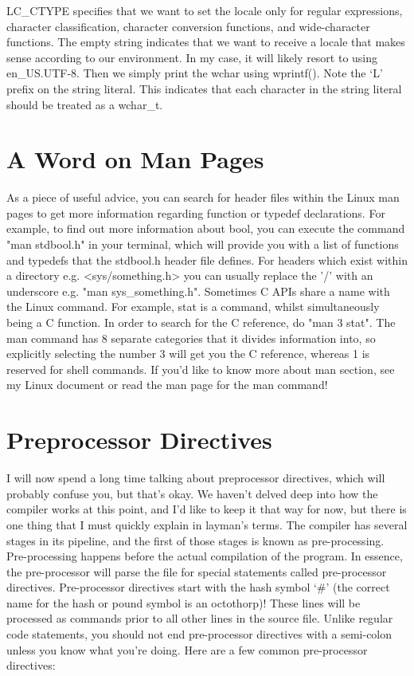 \documentclass{article}
\begin{document}
LC\_CTYPE specifies that we want to set the locale only for regular expressions, character classification,
character conversion functions, and wide-character functions. The empty string indicates that we want to
receive a locale that makes sense according to our environment. In my case, it will likely resort to using
en\_US.UTF-8. Then we simply print the wchar using wprintf(). Note the ‘L’ prefix on the string literal. This
indicates that each character in the string literal should be treated as a wchar\_t.

\section{A Word on Man Pages}

As a piece of useful advice, you can search for header files within the Linux man pages to get more information
regarding function or typedef declarations. For example, to find out more information about bool, you can
execute the command "man stdbool.h" in your terminal, which will provide you with a list of functions and
typedefs that the stdbool.h header file defines. For headers which exist within a directory e.g.
<sys/something.h> you can usually replace the '/' with an underscore e.g. "man sys\_something.h". Sometimes C
APIs share a name with the Linux command. For example, stat is a command, whilst simultaneously being a C
function. In order to search for the C reference, do "man 3 stat". The man command has 8 separate categories
that it divides information into, so explicitly selecting the number 3 will get you the C reference, whereas 1
is reserved for shell commands. If you’d like to know more about man section, see my Linux document or read
the man page for the man command!

\section{Preprocessor Directives}

I will now spend a long time talking about preprocessor directives, which will probably confuse you,
but that’s okay. We haven’t delved deep into how the compiler works at this point, and I’d like to keep it
that way for now, but there is one thing that I must quickly explain in layman’s terms. The compiler has
several  stages in its pipeline, and the first of those stages is known as pre-processing. Pre-processing
happens before the actual compilation of the program. In essence, the pre-processor will parse the file for
special statements called pre-processor directives. Pre-processor directives start with the hash symbol ‘\#’
(the correct name for the hash or pound symbol is an octothorp)! These lines will be processed as commands
prior to all other lines in the source file. Unlike regular code statements, you should not end pre-processor
directives with a semi-colon unless you know what you’re doing. Here are a few common pre-processor directives:
\end{document}
